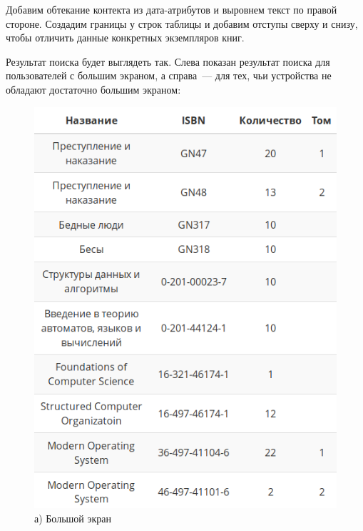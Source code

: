 Добавим обтекание контекта из дата-атрибутов и выровнем текст
по правой стороне. Создадим границы у строк таблицы и добавим
отступы сверху и снизу, чтобы отличить данные конкретных
экземпляров книг.

\newpage

Результат поиска будет выглядеть так. Слева показан результат поиска для пользователей с большим экраном,
а справа~--- для тех, чьи устройства не обладают достаточно большим экраном:
\begin{figure}[h]
\begin{minipage}[h]{0.49\linewidth}
\includegraphics[scale=0.60]{images/search-result2.png} \\ а) Большой экран
\end{minipage}
\hfill
\begin{minipage}[h]{0.49\linewidth}

\end{minipage}
\end{figure}
